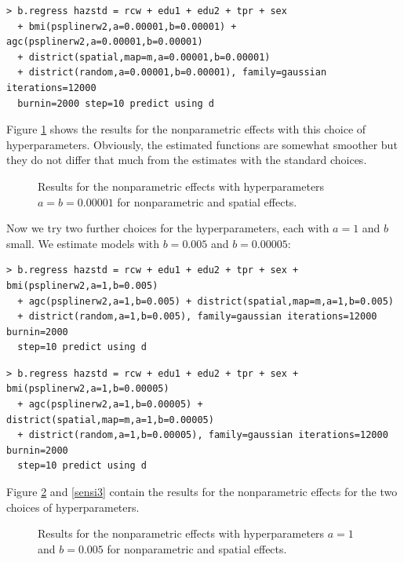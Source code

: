 \documentclass{article}
\begin{document}
\begin{verbatim}
> b.regress hazstd = rcw + edu1 + edu2 + tpr + sex
  + bmi(psplinerw2,a=0.00001,b=0.00001) + agc(psplinerw2,a=0.00001,b=0.00001)
  + district(spatial,map=m,a=0.00001,b=0.00001)
  + district(random,a=0.00001,b=0.00001), family=gaussian iterations=12000
  burnin=2000 step=10 predict using d
\end{verbatim}

Figure \ref{sensi1} shows the results for the nonparametric
effects with this choice of hyperparameters. Obviously, the
estimated functions are somewhat smoother but they do not differ
that much from the estimates with the standard choices.

\begin{figure}[ht]
\begin{center}
 {\it\caption{Results for
the nonparametric effects with hyperparameters $a=b=0.00001$ for
nonparametric and spatial effects.\label{sensi1}}}
\end{center}
\end{figure}

Now we try two further choices for the hyperparameters, each with
$a=1$ and $b$ small. We estimate models with $b=0.005$ and
$b=0.00005$:

\begin{verbatim}
> b.regress hazstd = rcw + edu1 + edu2 + tpr + sex + bmi(psplinerw2,a=1,b=0.005)
  + agc(psplinerw2,a=1,b=0.005) + district(spatial,map=m,a=1,b=0.005)
  + district(random,a=1,b=0.005), family=gaussian iterations=12000 burnin=2000
  step=10 predict using d
\end{verbatim}

\begin{verbatim}
> b.regress hazstd = rcw + edu1 + edu2 + tpr + sex + bmi(psplinerw2,a=1,b=0.00005)
  + agc(psplinerw2,a=1,b=0.00005) + district(spatial,map=m,a=1,b=0.00005)
  + district(random,a=1,b=0.00005), family=gaussian iterations=12000 burnin=2000
  step=10 predict using d
\end{verbatim}

Figure \ref{sensi2} and \ref{sensi3} contain the results for the
nonparametric effects for the two choices of hyperparameters.

\begin{figure}[ht]
\begin{center}
 {\it\caption{Results for
the nonparametric effects with hyperparameters $a=1$ and $b=0.005$
for nonparametric and spatial effects.\label{sensi2}}}
\end{center}
\end{figure}
\end{document}
